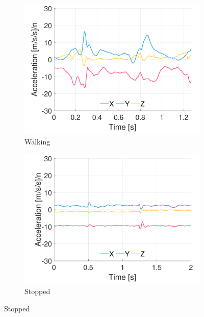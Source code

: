 \begin{figure}[p]
\centering
    \begin{subfigure}[b]{0.49\textwidth}
         \centering
         \includegraphics[width=\textwidth]{content/3-Methods/example-data/ch3_example_data_subject_01_l_hip_accel_activity_walking.pdf}
         \caption{Walking}
    \end{subfigure}
    \begin{subfigure}[b]{0.49\textwidth}
         \centering
         \includegraphics[width=\textwidth]{content/3-Methods/example-data/ch3_example_data_subject_01_l_hip_accel_activity_stop.pdf}
         \caption{Stopped}
    \end{subfigure}
    

\end{figure}
